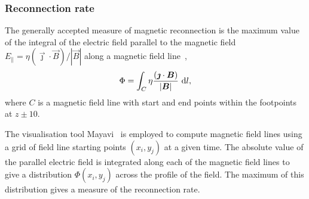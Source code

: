

\subsubsection{Reconnection rate}

The generally accepted measure of magnetic reconnection is the maximum value of the integral of the electric field parallel to the magnetic field $E_{\parallel} = \eta {(\vec{\jmath} \cdot \vec{B})}/|\vec{B}|$ along a magnetic field line~\cite{galsgaardSteadyStateReconnection2011,priestNatureThreedimensionalMagnetic2003,schindlerGeneralMagneticReconnection1988},
\begin{equation}
  \Phi = \int_{C} \eta \frac{(\vec{\jmath} \cdot \vec{B})}{|\vec{B}|}\ {\rm d}l,
\end{equation}
where $C$ is a magnetic field line with start and end points within the footpoints at $z\pm10$.

The visualisation tool Mayavi~\cite{ramachandran2011mayavi} is employed to compute magnetic field lines using a grid of field line starting points $(x_i, y_j)$ at a given time. The absolute value of the parallel electric field is integrated along each of the magnetic field lines to give a distribution $\Phi(x_i, y_j)$ across the profile of the field. The maximum of this distribution gives a measure of the reconnection rate.

